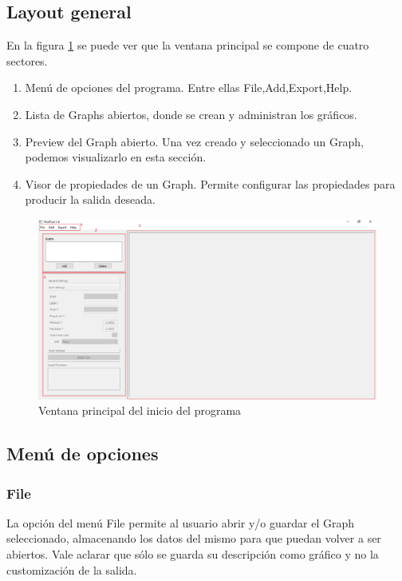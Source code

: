 \documentclass[a4paper,10pt]{article}
\begin{document}
\subsection{Layout general}
En la figura \ref{fig:initial_window} se puede ver que la ventana principal se compone de cuatro sectores.
\begin{enumerate}
	\item Men\'u de opciones del programa. Entre ellas File,Add,Export,Help.
	\item Lista de Graphs abiertos, donde se crean y administran los gr\'aficos.
	\item Preview del Graph abierto. Una vez creado y seleccionado un Graph, podemos visualizarlo en esta secci\'on.
	\item Visor de propiedades de un Graph. Permite configurar las propiedades para producir la salida deseada.
\end{enumerate}

\begin{figure}[H]
	\begin{center}
	\includegraphics[scale=0.5]{resources/initial_window.png}
	\caption{Ventana principal del inicio del programa}
	\label{fig:initial_window}
	\end{center}
\end{figure}

\subsection{Men\'u de opciones}

\subsubsection{File}
La opci\'on del men\'u File permite al usuario abrir y/o guardar el Graph seleccionado, almacenando los datos del
mismo para que puedan volver a ser abiertos. Vale aclarar que s\'olo se guarda su descripci\'on como gr\'afico y no la customizaci\'on de la salida.
\end{document}
